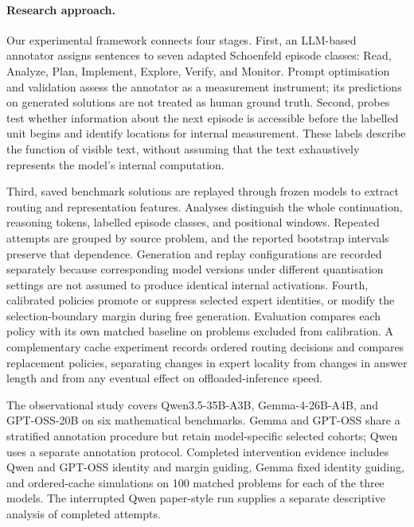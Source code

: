 \documentclass[12pt,a4paper,twoside,openright]{book}
\begin{document}
\paragraph{Research approach.}
Our experimental framework connects four stages. First, an LLM-based annotator
assigns sentences to seven adapted Schoenfeld episode classes: Read,
Analyze, Plan, Implement, Explore, Verify, and Monitor. Prompt optimisation
and validation assess the annotator as a measurement instrument; its
predictions on generated solutions are not treated as human ground truth.
Second, probes test whether information about the next episode is accessible
before the labelled unit begins and identify locations for internal
measurement. These labels describe the function of visible text, without
assuming that the text exhaustively represents the model's internal
computation.

Third, saved benchmark solutions are replayed through frozen models to
extract routing and representation features. Analyses distinguish the whole
continuation, reasoning tokens, labelled episode classes, and positional
windows. Repeated attempts are grouped by source problem, and the reported
bootstrap intervals preserve that dependence. Generation and replay
configurations are recorded separately because corresponding model versions
under different quantisation settings are not assumed to produce identical
internal activations. Fourth, calibrated policies promote or suppress
selected expert identities, or modify the selection-boundary margin during
free generation. Evaluation compares each policy with its own matched
baseline on problems excluded from calibration. A complementary cache
experiment records ordered routing decisions and compares replacement
policies, separating changes in expert locality from changes in answer
length and from any eventual effect on offloaded-inference speed.

The observational study covers Qwen3.5-35B-A3B, Gemma-4-26B-A4B, and
GPT-OSS-20B on six mathematical benchmarks. Gemma and GPT-OSS share a
stratified annotation procedure but retain model-specific selected cohorts;
Qwen uses a separate annotation protocol. Completed intervention evidence
includes Qwen and GPT-OSS identity and margin guiding, Gemma fixed
identity guiding, and ordered-cache simulations on 100 matched problems
for each of the three models. The interrupted
Qwen paper-style run supplies a separate descriptive analysis of completed attempts.
\end{document}
